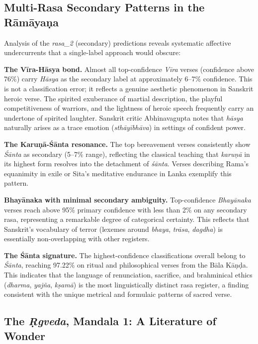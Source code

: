 \documentclass[11pt]{article}
\begin{document}
\subsection{Multi-Rasa Secondary Patterns in the R\=am\=aya\d na}

Analysis of the \textit{rasa\_2} (secondary) predictions reveals systematic affective undercurrents that a single-label approach would obscure:

\textbf{The V\=ira-H\=asya bond.} Almost all top-confidence \textit{V\=ira} verses (confidence above 76\%) carry \textit{H\=asya} as the secondary label at approximately 6--7\% confidence. This is not a classification error; it reflects a genuine aesthetic phenomenon in Sanskrit heroic verse. The spirited exuberance of martial description, the playful competitiveness of warriors, and the lightness of heroic speech frequently carry an undertone of spirited laughter. Sanskrit critic Abhinavagupta notes that \textit{h\=asya} naturally arises as a trace emotion (\textit{sth\=ay\=ibh\=ava}) in settings of confident power.

\textbf{The Karu\d n\=a-Ś\=anta resonance.} The top bereavement verses consistently show \textit{Ś\=anta} as secondary (5--7\% range), reflecting the classical teaching that \textit{karu\d n\=a} in its highest form resolves into the detachment of \textit{ś\=anta}. Verses describing Rama's equanimity in exile or Sita's meditative endurance in Lanka exemplify this pattern.

\textbf{Bhay\=anaka with minimal secondary ambiguity.} Top-confidence \textit{Bhay\=anaka} verses reach above 95\% primary confidence with less than 2\% on any secondary rasa, representing a remarkable degree of categorical certainty. This reflects that Sanskrit's vocabulary of terror (lexemes around \textit{bhaya}, \textit{tr\=asa}, \textit{dagdha}) is essentially non-overlapping with other registers.

\textbf{The Ś\=anta signature.} The highest-confidence classifications overall belong to \textit{Ś\=anta}, reaching 97.22\% on ritual and philosophical verses from the B\=ala K\=a\d n\d da. This indicates that the language of renunciation, sacrifice, and brahminical ethics (\textit{dharma}, \textit{yaj\~na}, \textit{k\d sam\=a}) is the most linguistically distinct rasa register, a finding consistent with the unique metrical and formulaic patterns of sacred verse.

\subsection{The \textit{\d Rgveda}, Mandala 1: A Literature of Wonder}
\end{document}
